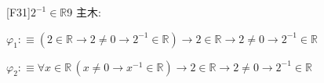 \begin{fullproof}{[F31]}{$2^{-1} \in \mathbb{R}$}{9}\label{tree:InvTwoR}
\noindent 主木:
\begin{ptree}
\end{ptree}
\begin{abbrevlist}
\item $\varphi_{1} :\equiv (2 \in \mathbb{R} \to 2 \neq 0 \to 2^{-1} \in \mathbb{R}) \to 2 \in \mathbb{R} \to 2 \neq 0 \to 2^{-1} \in \mathbb{R}$
\item $\varphi_{2} :\equiv \forall x \in \mathbb{R}\,(x \neq 0 \to x^{-1} \in \mathbb{R}) \to 2 \in \mathbb{R} \to 2 \neq 0 \to 2^{-1} \in \mathbb{R}$
\end{abbrevlist}
\end{fullproof}
